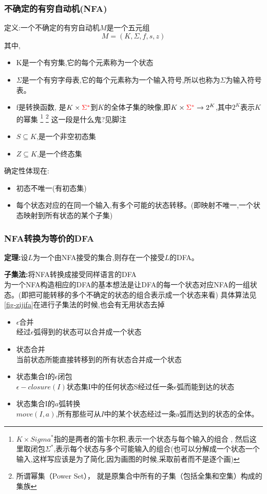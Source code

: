   \subsubsection{不确定的有穷自动机(NFA)}
  定义:一个不确定的有穷自动机$M$是一个五元组
  \[M = (K , \Sigma , f , s , z)\]
  其中,
  \begin{itemize}
    \item [(1)] K是一个有穷集,它的每个元素称为一个状态
    \item [(2)] $\Sigma$是一个有穷字母表,它的每个元素称为一个输入符号,所以也称为$\Sigma$为输入符号表。
    \item [(3)] f是转换函数, 是$K\times {\color{red}\Sigma^*}$到$K$的全体子集的映像,即$K\times {\color{red}\Sigma^*} \to 2^K$,其中$2^K$表示$K$的幂集
    \footnote{$K\times  Sigma^*$指的是两者的笛卡尔积,表示一个状态与每个输入的组合 ,
    然后这里取闭包$\Sigma^*$,表示每个状态与多个可能输入的组合(也可以分解成一个状态一个输入,这样写应该是为了简化,因为画图的时候,采取前者而不是逐个画)}
    \footnote{所谓幂集（Power Set）， 就是原集合中所有的子集（包括全集和空集）构成的集族}
    {\color{blue}这一段是什么鬼?见脚注}
    \item [(4)] $S\subseteq K$,是一个非空初态集
    \item [(5)] $Z \subseteq  K$,是一个终态集
  \end{itemize}
  确定性体现在:
  \begin{itemize}
    \item 初态不唯一(有初态集)
    \item 每个状态对应的在同一个输入,有多个可能的状态转移。(即映射不唯一,一个状态映射到所有状态的某个子集)
  \end{itemize}

  \subsubsection{NFA转换为等价的DFA}
  \textbf{定理:}设$L$为一个由NFA接受的集合,则存在一个接受$L$的DFA。

  \spaceline
  \textbf{子集法:}将NFA转换成接受同样语言的DFA\\
  为一个NFA构造相应的DFA的基本想法是让DFA的每一个状态对应NFA的一组状态。(即把可能转移的多个不确定的状态的组合表示成一个状态来看)
  具体算法见\ref{fig-zijifa}{\color{blue}在进行子集法的时候,也会有无用状态去掉}

  \begin{itemize}
    \item $\epsilon$合并\\
    经过$\epsilon$弧得到的状态可以合并成一个状态
    \item 状态合并\\
    当前状态所能直接转移到的所有状态合并成一个状态
    \item 状态集合I的$\epsilon$闭包\\
    $\epsilon-closure(I)$状态集I中的任何状态S经过任一条$\epsilon$弧而能到达的状态
    \item 状态集合I的$a$弧转换\\
    $move(I,a)$,所有那些可从$I$中的某个状态经过一条a弧而达到的状态的全体。
  \end{itemize}

